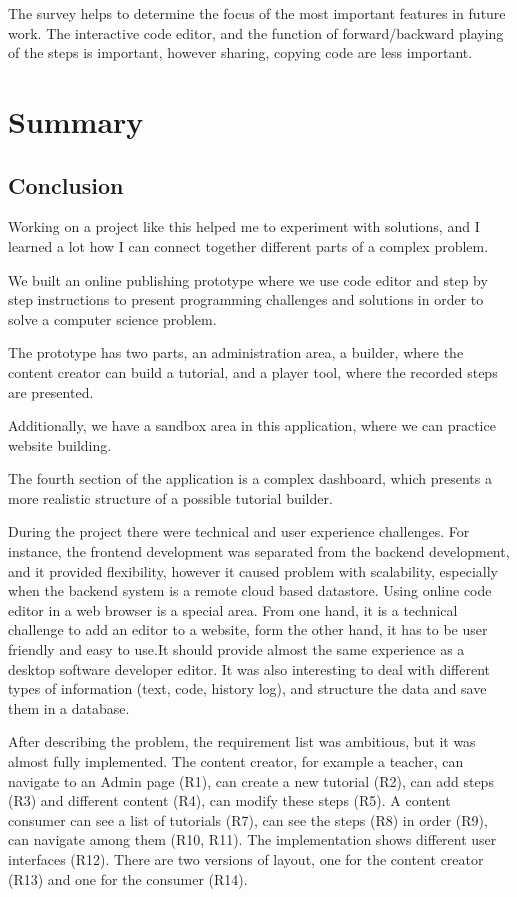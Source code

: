 \documentclass[11pt, a4paper, oneside, openright, medskipamount]{report}
\begin{document}
The survey helps to determine the focus of the most important features in future work. The interactive code editor, and the function of forward/backward playing of the steps is important, however sharing, copying code are less important.

\chapter{Summary}

\section{Conclusion}

Working on a project like this helped me to experiment with solutions, and I learned a lot how I can connect together different parts of a complex problem.

We built an online publishing prototype where we use code editor and step by step instructions to present programming challenges and solutions in order to solve a computer science problem.

The prototype has two parts, an administration area, a builder, where the content creator can build a tutorial, and a player tool, where the recorded steps are presented.

Additionally, we have a sandbox area in this application, where we can practice website building.

The fourth section of the application is a complex dashboard, which presents a more realistic structure of a possible tutorial builder.

During the project there were technical and user experience challenges. For instance, the frontend development was separated from the backend development, and it provided flexibility, however it caused problem with scalability, especially when the backend system is a remote cloud based datastore. Using online code editor in a web browser is a special area. From one hand, it is a technical challenge to add an editor to a website, form the other hand, it has to be user friendly and easy to use.It should provide almost the same experience as a desktop software developer editor. It was also interesting  to deal with different types of information (text, code, history log), and structure the data and save them  in a database.

After describing the problem, the requirement list was ambitious, but it was almost fully implemented. The content creator, for example a teacher, can navigate to an Admin page (R1), can create a new tutorial (R2), can add steps (R3) and different content (R4), can modify these steps  (R5). A content consumer can see a list of tutorials (R7), can see the steps (R8) in order (R9), can navigate among them (R10, R11). The implementation shows different user interfaces (R12). There are two versions of layout, one for the content creator (R13) and one for the consumer (R14).
\end{document}
